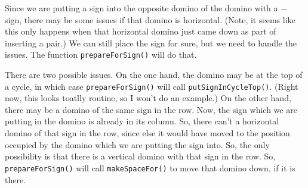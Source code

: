 \documentclass[12pt]{article}
\numberwithin{equation}{section}
\newcommand{\horizontalDominoMaybe}[3]{\filldraw [dominoMaybeStyle] (#2 - 1 + \eps, #1 - 1 + \eps) rectangle + (2 - \teps, 1 -\teps) node [dominoText] {$#3$};}
\newcommand{\verticalDominoMaybeShift}[4]{\filldraw [dominoMaybeStyle] (#2 - 1 + #4 + \eps,  #1 - 1 + \eps) rectangle + (1 - \teps,2 -\teps) node [dominoText] {$#3$};}
\begin{document}
\begin{itemize}
\begin{itemize}
\begin{itemize}
        Since we are putting a sign into the opposite domino of the domino with a $-$ sign, there may be some issues if that domino is horizontal.
        (Note, it seems like this only happens when that horizontal domino just came down as part of inserting a pair.)
        We can still place the sign for sure, but we need to handle the issues.
        The function \texttt{prepareForSign()} will do that.

        There are two possible issues.
        On the one hand, the domino may be at the top of a cycle, in which case \texttt{prepareForSign()} will call \texttt{putSignInCycleTop()}.
        (Right now, this looks toatlly routine, so I won't do an example.)
        On the other hand, there may be a domino of the same sign in the row.
        Now, the sign which we are putting in the domino is already in its column.
        So, there can't a horizontal domino of that sign in the row, since else it would have moved to the position occupied by the domino which we are putting the sign into.
        So, the only possibility is that there is a vertical domino with that sign in the row.
        So, \texttt{prepareForSign()} will call \texttt{makeSpaceFor()} to move that domino down, if it is there.
        \begin{figure}[H]
          \centering
        \end{figure}


\end{itemize}
\end{itemize}
\end{itemize}
\end{document}
